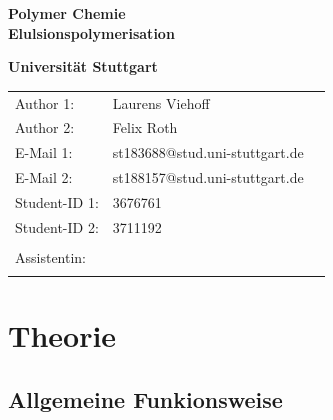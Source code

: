 \documentclass[10pt,a4paper,ngerman]{scrartcl}
\begin{document}
\begin{titlepage}
	\vspace*{2,5cm}
	\begin{center}
		\begin{LARGE}
			\textbf{Polymer Chemie}\\
			\textbf{Elulsionspolymerisation}\\
		\end{LARGE}
		\vspace{1cm}
		\textbf{Universität Stuttgart}\\
		\vspace*{1,5cm}
		\begin{tabular}{lp{}l}
			Author 1:     &Laurens Viehoff\\
            Author 2:     &Felix Roth\\   
			E-Mail 1:      &st183688@stud.uni-stuttgart.de\\
            E-Mail 2:      &st188157@stud.uni-stuttgart.de  \\
			Student-ID 1: & 3676761   \\ 
            Student-ID 2: & 3711192 \\ \\
			Assistentin:  &   \\ \\ 
		\end{tabular}
	\end{center}

    
\end{titlepage}
\thispagestyle{empty}
\renewcommand{\thepage}{\arabic{page}}
\newpage
\tableofcontents
\setcounter{page}{1}
\renewcommand{\thepage}{\arabic{page}}
\newpage

\section{Theorie}

	\subsection{Allgemeine Funkionsweise}
\end{document}
